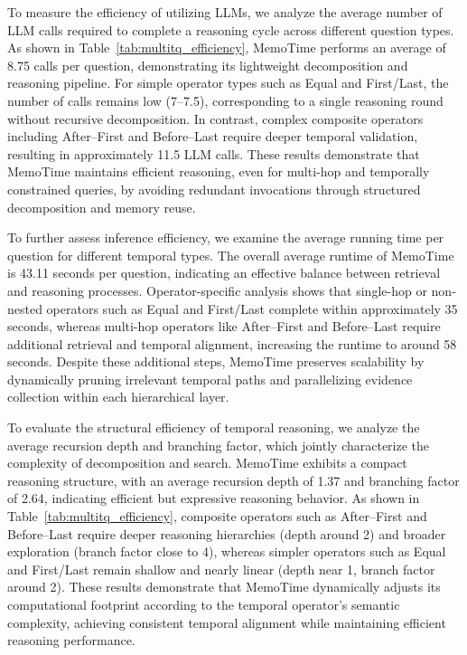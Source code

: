 To measure the efficiency of utilizing LLMs, we analyze the average number of LLM calls required to complete a reasoning cycle across different question types. 
As shown in Table~\ref{tab:multitq_efficiency}, MemoTime performs an average of 8.75 calls per question, demonstrating its lightweight decomposition and reasoning pipeline. 
For simple operator types such as Equal and First/Last, the number of calls remains low (7–7.5), corresponding to a single reasoning round without recursive decomposition. 
In contrast, complex composite operators including After–First and Before–Last require deeper temporal validation, resulting in approximately 11.5 LLM calls. 
These results demonstrate that MemoTime maintains efficient reasoning, even for multi-hop and temporally constrained queries, by avoiding redundant invocations through structured decomposition and memory reuse.

To further assess inference efficiency, we examine the average running time per question for different temporal types. 
The overall average runtime of MemoTime is 43.11 seconds per question, indicating an effective balance between retrieval and reasoning processes. 
Operator-specific analysis shows that single-hop or non-nested operators such as Equal and First/Last complete within approximately 35 seconds, whereas multi-hop operators like After–First and Before–Last require additional retrieval and temporal alignment, increasing the runtime to around 58 seconds. 
Despite these additional steps, MemoTime preserves scalability by dynamically pruning irrelevant temporal paths and parallelizing evidence collection within each hierarchical layer.



To evaluate the structural efficiency of temporal reasoning, we analyze the average recursion depth and branching factor, which jointly characterize the complexity of decomposition and search. 
MemoTime exhibits a compact reasoning structure, with an average recursion depth of 1.37 and branching factor of 2.64, indicating efficient but expressive reasoning behavior. 
As shown in Table~\ref{tab:multitq_efficiency}, composite operators such as After–First and Before–Last require deeper reasoning hierarchies (depth around 2) and broader exploration (branch factor close to 4), whereas simpler operators such as Equal and First/Last remain shallow and nearly linear (depth near 1, branch factor around 2). 
These results demonstrate that MemoTime dynamically adjusts its computational footprint according to the temporal operator’s semantic complexity, achieving consistent temporal alignment while maintaining efficient reasoning performance.


